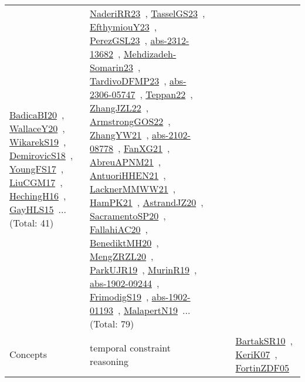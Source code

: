 {\begin{longtable}{lp{3cm}>{\raggedright\arraybackslash}p{6cm}>{\raggedright\arraybackslash}p{6cm}>{\raggedright\arraybackslash}p{8cm}}
\href{works/BadicaBI20.pdf}{BadicaBI20}~\cite{BadicaBI20}, \href{works/WallaceY20.pdf}{WallaceY20}~\cite{WallaceY20}, \href{works/WikarekS19.pdf}{WikarekS19}~\cite{WikarekS19}, \href{works/DemirovicS18.pdf}{DemirovicS18}~\cite{DemirovicS18}, \href{works/YoungFS17.pdf}{YoungFS17}~\cite{YoungFS17}, \href{works/LiuCGM17.pdf}{LiuCGM17}~\cite{LiuCGM17}, \href{works/HechingH16.pdf}{HechingH16}~\cite{HechingH16}, \href{works/GayHLS15.pdf}{GayHLS15}~\cite{GayHLS15}... (Total: 41) & \href{works/NaderiRR23.pdf}{NaderiRR23}~\cite{NaderiRR23}, \href{works/TasselGS23.pdf}{TasselGS23}~\cite{TasselGS23}, \href{works/EfthymiouY23.pdf}{EfthymiouY23}~\cite{EfthymiouY23}, \href{works/PerezGSL23.pdf}{PerezGSL23}~\cite{PerezGSL23}, \href{works/abs-2312-13682.pdf}{abs-2312-13682}~\cite{abs-2312-13682}, \href{works/Mehdizadeh-Somarin23.pdf}{Mehdizadeh-Somarin23}~\cite{Mehdizadeh-Somarin23}, \href{works/TardivoDFMP23.pdf}{TardivoDFMP23}~\cite{TardivoDFMP23}, \href{works/abs-2306-05747.pdf}{abs-2306-05747}~\cite{abs-2306-05747}, \href{works/Teppan22.pdf}{Teppan22}~\cite{Teppan22}, \href{works/ZhangJZL22.pdf}{ZhangJZL22}~\cite{ZhangJZL22}, \href{works/ArmstrongGOS22.pdf}{ArmstrongGOS22}~\cite{ArmstrongGOS22}, \href{works/ZhangYW21.pdf}{ZhangYW21}~\cite{ZhangYW21}, \href{works/abs-2102-08778.pdf}{abs-2102-08778}~\cite{abs-2102-08778}, \href{works/FanXG21.pdf}{FanXG21}~\cite{FanXG21}, \href{works/AbreuAPNM21.pdf}{AbreuAPNM21}~\cite{AbreuAPNM21}, \href{works/AntuoriHHEN21.pdf}{AntuoriHHEN21}~\cite{AntuoriHHEN21}, \href{works/LacknerMMWW21.pdf}{LacknerMMWW21}~\cite{LacknerMMWW21}, \href{works/HamPK21.pdf}{HamPK21}~\cite{HamPK21}, \href{works/AstrandJZ20.pdf}{AstrandJZ20}~\cite{AstrandJZ20}, \href{works/SacramentoSP20.pdf}{SacramentoSP20}~\cite{SacramentoSP20}, \href{works/FallahiAC20.pdf}{FallahiAC20}~\cite{FallahiAC20}, \href{works/BenediktMH20.pdf}{BenediktMH20}~\cite{BenediktMH20}, \href{works/MengZRZL20.pdf}{MengZRZL20}~\cite{MengZRZL20}, \href{works/ParkUJR19.pdf}{ParkUJR19}~\cite{ParkUJR19}, \href{works/MurinR19.pdf}{MurinR19}~\cite{MurinR19}, \href{works/abs-1902-09244.pdf}{abs-1902-09244}~\cite{abs-1902-09244}, \href{works/FrimodigS19.pdf}{FrimodigS19}~\cite{FrimodigS19}, \href{works/abs-1902-01193.pdf}{abs-1902-01193}~\cite{abs-1902-01193}, \href{works/MalapertN19.pdf}{MalapertN19}~\cite{MalapertN19}... (Total: 79)\\
Concepts & temporal constraint reasoning &  &  & \href{works/BartakSR10.pdf}{BartakSR10}~\cite{BartakSR10}, \href{works/KeriK07.pdf}{KeriK07}~\cite{KeriK07}, \href{works/FortinZDF05.pdf}{FortinZDF05}~\cite{FortinZDF05}\\

\end{longtable}}
